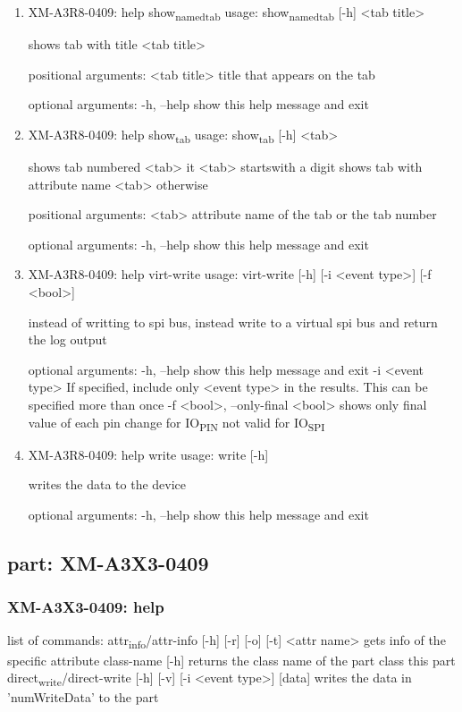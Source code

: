 \documentclass[11pt]{article}
\begin{document}
\begin{enumerate}
\item XM-A3R8-0409: help show\textsubscript{named}\textsubscript{tab}
\label{sec:orgd383952}
usage: show\textsubscript{named}\textsubscript{tab} [-h] <tab title>

shows tab with title <tab title>

positional arguments:
  <tab title>  title that appears on the tab

optional arguments:
  -h, --help   show this help message and exit

\item XM-A3R8-0409: help show\textsubscript{tab}
\label{sec:orgf907399}
usage: show\textsubscript{tab} [-h] <tab>

shows tab numbered <tab> it <tab> startswith a digit shows tab with attribute
name <tab> otherwise

positional arguments:
  <tab>       attribute name of the tab or the tab number

optional arguments:
  -h, --help  show this help message and exit

\item XM-A3R8-0409: help virt-write
\label{sec:orgd178215}
usage: virt-write [-h] [-i <event type>] [-f <bool>]

instead of writting to spi bus, instead write to a virtual spi bus and return
the log output

optional arguments:
  -h, --help            show this help message and exit
  -i <event type>       If specified, include only <event type> in the
                        results. This can be specified more than once
  -f <bool>, --only-final <bool>
                        shows only final value of each pin change for IO\textsubscript{PIN}
                        not valid for IO\textsubscript{SPI}

\item XM-A3R8-0409: help write
\label{sec:org097e049}
usage: write [-h]

writes the data to the device

optional arguments:
  -h, --help  show this help message and exit
\end{enumerate}

\subsection{part: XM-A3X3-0409}
\label{sec:org16ef4df}
\subsubsection{XM-A3X3-0409: help}
\label{sec:orgf7552f9}
list of commands:
  attr\textsubscript{info}/attr-info [-h] [-r] [-o] [-t] <attr name>
    gets info of the specific attribute
  class-name [-h]
    returns the class name of the part class this part
  direct\textsubscript{write}/direct-write [-h] [-v] [-i <event type>] [data]
    writes the data in 'numWriteData' to the part
\end{document}
